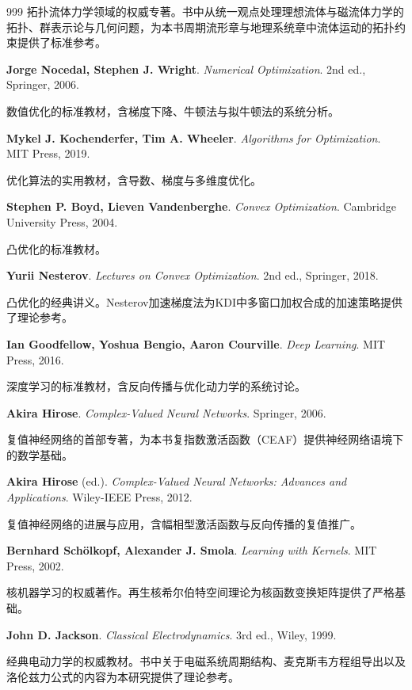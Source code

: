 \begin{thebibliography}{999}
拓扑流体力学领域的权威专著。书中从统一观点处理理想流体与磁流体力学的拓扑、群表示论与几何问题，为本书周期流形章与地理系统章中流体运动的拓扑约束提供了标准参考。

 \textbf{Jorge Nocedal, Stephen J. Wright}. \textit{Numerical Optimization}. 2nd ed., Springer, 2006.

数值优化的标准教材，含梯度下降、牛顿法与拟牛顿法的系统分析。

 \textbf{Mykel J. Kochenderfer, Tim A. Wheeler}. \textit{Algorithms for Optimization}. MIT Press, 2019.

优化算法的实用教材，含导数、梯度与多维度优化。

 \textbf{Stephen P. Boyd, Lieven Vandenberghe}. \textit{Convex Optimization}. Cambridge University Press, 2004.

凸优化的标准教材。

 \textbf{Yurii Nesterov}. \textit{Lectures on Convex Optimization}. 2nd ed., Springer, 2018.

凸优化的经典讲义。Nesterov加速梯度法为KDI中多窗口加权合成的加速策略提供了理论参考。

 \textbf{Ian Goodfellow, Yoshua Bengio, Aaron Courville}. \textit{Deep Learning}. MIT Press, 2016.

深度学习的标准教材，含反向传播与优化动力学的系统讨论。

 \textbf{Akira Hirose}. \textit{Complex-Valued Neural Networks}. Springer, 2006.

复值神经网络的首部专著，为本书复指数激活函数（CEAF）提供神经网络语境下的数学基础。

 \textbf{Akira Hirose} (ed.). \textit{Complex-Valued Neural Networks: Advances and Applications}. Wiley-IEEE Press, 2012.

复值神经网络的进展与应用，含幅相型激活函数与反向传播的复值推广。

 \textbf{Bernhard Sch\"olkopf, Alexander J. Smola}. \textit{Learning with Kernels}. MIT Press, 2002.

核机器学习的权威著作。再生核希尔伯特空间理论为核函数变换矩阵提供了严格基础。

 \textbf{John D. Jackson}. \textit{Classical Electrodynamics}. 3rd ed., Wiley, 1999.

经典电动力学的权威教材。书中关于电磁系统周期结构、麦克斯韦方程组导出以及洛伦兹力公式的内容为本研究提供了理论参考。


\end{thebibliography}
